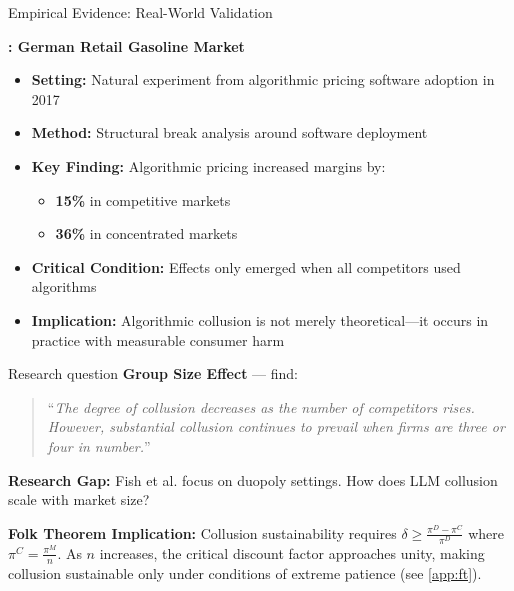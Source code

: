 \documentclass[10pt, aspectratio=169]{beamer}
\begin{document}
\begin{frame}{Empirical Evidence: Real-World Validation}
    \begin{center}
    \begin{block}{\textbf{\textcite{assad_algorithmic_2024}: German Retail Gasoline Market}}
    \begin{itemize}
        \item \textbf{Setting:} Natural experiment from algorithmic pricing software adoption in 2017
        \item \textbf{Method:} Structural break analysis around software deployment
        \item \textbf{Key Finding:} Algorithmic pricing increased margins by:
        \begin{itemize}
            \item \textbf{15\%} in competitive markets
            \item \textbf{36\%} in concentrated markets
        \end{itemize}
        \item \textbf{Critical Condition:} Effects only emerged when all competitors used algorithms
        \item \textbf{Implication:} Algorithmic collusion is not merely theoretical---it occurs in practice with measurable consumer harm
    \end{itemize}
    \end{block}
    \end{center}
\end{frame}

\begin{frame}{Research question}
    \textbf{Group Size Effect} --- \textcite[]{calvano_artificial_2020} find: 
    
    \vspace{0.5cm}
    
    \begin{quote}
        \enquote{\emph{The degree of collusion decreases as the number of competitors rises. However,   substantial collusion continues to prevail when firms are three or four in number.}}
    \end{quote}
    \vfill
    \begin{center}
        \begin{tcolorbox}[colback=gray!10, colframe=black, width=0.9\textwidth]
        \centering
        \textbf{Research Gap:} Fish et al. focus on duopoly settings. How does LLM collusion scale with market size?
        
        \vspace{0.5cm}
        
        \textbf{Folk Theorem Implication:} Collusion sustainability requires $\delta \geq \frac{\pi^D - \pi^C}{\pi^D}$ where $\pi^C = \frac{\pi^M}{n}$. As $n$ increases, the critical discount factor approaches unity, making collusion sustainable only under conditions of extreme patience (see \ref{app:ft}).
        \end{tcolorbox}
    \end{center}
\end{frame}
\end{document}
